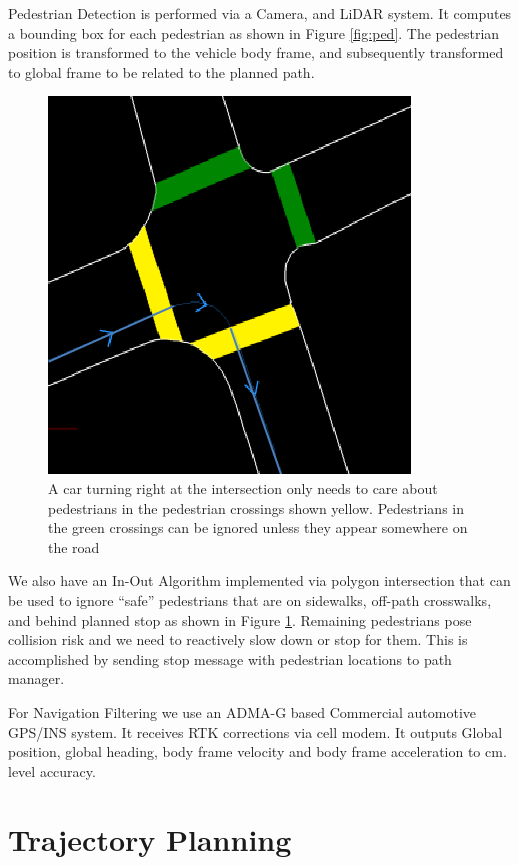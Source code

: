 \documentclass[letterpaper, 10 pt, conference]{ieeeconf}  %
\begin{document}

Pedestrian Detection is performed via a Camera, and LiDAR system. It computes a bounding 
box for each pedestrian as shown in Figure \ref{fig:ped}. The pedestrian position is 
transformed to the vehicle body frame, and subsequently transformed to global frame to be related to the planned path.

\begin{figure}[thpb]
  \centering
  \includegraphics[width=0.3\columnwidth]{graphics/IntersectionCrosswalks.png}
  \caption{A car turning right at the intersection only needs to care about pedestrians in the 
pedestrian crossings shown yellow. Pedestrians in the green crossings can be ignored unless they
appear somewhere on the road}
  \label{fig:intersect}
\end{figure}

We also have an In-Out Algorithm implemented via polygon intersection that can be used to
ignore “safe” pedestrians that are on sidewalks, off-path crosswalks, and behind planned stop
as shown in Figure \ref{fig:intersect}.
Remaining pedestrians pose collision risk and we need to reactively slow down or stop for them.
This is accomplished by sending stop message with pedestrian locations to path manager.

For Navigation Filtering we use an ADMA-G based Commercial automotive GPS/INS system.
It receives RTK corrections via cell modem.
It outputs Global position, global heading,
body frame velocity and body frame acceleration to cm. level accuracy.


\section{Trajectory Planning} \label{sec:trajectoryplanning}
\end{document}
